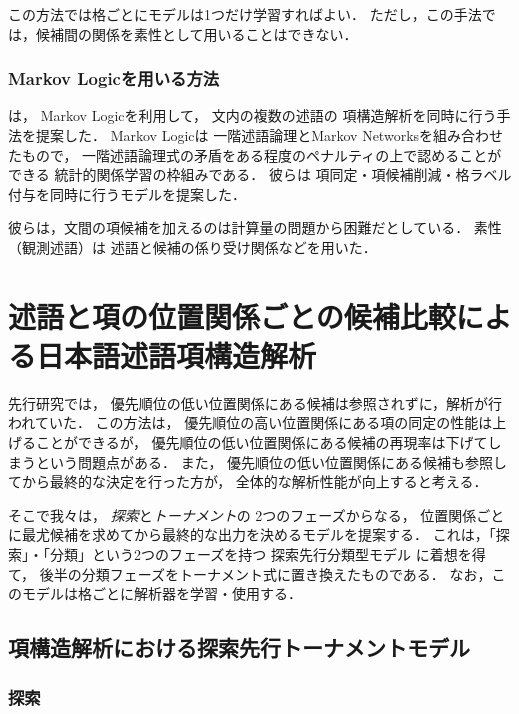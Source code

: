 \documentclass[japanese]{jnlp_1.4}
\newcommand{\newcite}[1]{}
\begin{document}
この方法では格ごとにモデルは1つだけ学習すればよい．
ただし，この手法では，候補間の関係を素性として用いることはできない．


\subsubsection{Markov Logicを用いる方法}

\newcite{Yoshikawa:2013:JNLP}は，
Markov Logicを利用して，
文内の複数の述語の	
項構造解析を同時に行う手法を提案した．
Markov Logicは
一階述語論理とMarkov Networksを組み合わせたもので，
一階述語論理式の矛盾をある程度のペナルティの上で認めることができる
統計的関係学習の枠組みである．
彼らは
項同定・項候補削減・格ラベル付与を同時に行うモデルを提案した．

彼らは，文間の項候補を加えるのは計算量の問題から困難だとしている．
素性（観測述語）は
述語と候補の係り受け関係などを用いた．


\section{述語と項の位置関係ごとの候補比較による日本語述語項構造解析}
\label{sec:sca}

先行研究では，
優先順位の低い位置関係にある候補は参照されずに，解析が行われていた．
この方法は，
優先順位の高い位置関係にある項の同定の性能は上げることができるが，
優先順位の低い位置関係にある候補の再現率は下げてしまうという問題点がある．
また，
優先順位の低い位置関係にある候補も参照してから最終的な決定を行った方が，
全体的な解析性能が向上すると考える．




そこで我々は，
\emph{探索}と\emph{トーナメント}の
2つのフェーズからなる，
位置関係ごとに最尤候補を求めてから最終的な出力を決めるモデルを提案する．
                これは，「探索」・「分類」という2つのフェーズを持つ
                探索先行分類型モデル\cite{Iida:2005:TALIP}
                に着想を得て，
                後半の分類フェーズをトーナメント式に置き換えたものである．
なお，このモデルは格ごとに解析器を学習・使用する．


\subsection{項構造解析における探索先行トーナメントモデル}

\subsubsection{探索}
\end{document}
